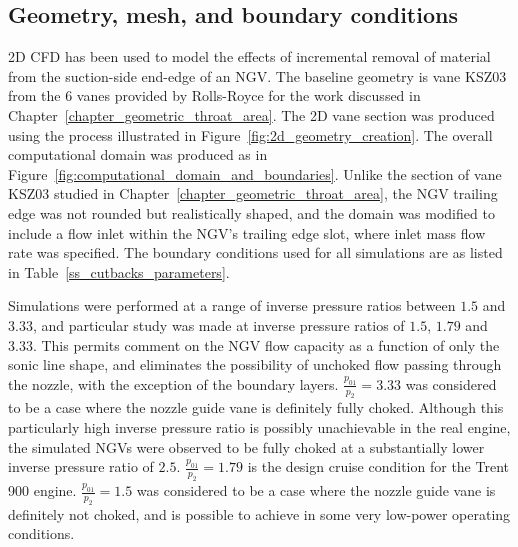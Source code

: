 \documentclass[a4paper, 11pt, oneside]{report}
\begin{document}
\subsection{Geometry, mesh, and boundary conditions}

2D CFD has been used to model the effects of incremental removal of material from the suction-side end-edge of an NGV. The baseline geometry is vane KSZ03 from the 6 vanes provided by Rolls-Royce for the work discussed in Chapter~\ref{chapter_geometric_throat_area}. The 2D vane section was produced using the process illustrated in Figure~\ref{fig:2d_geometry_creation}. The overall computational domain was produced as in Figure~\ref{fig:computational_domain_and_boundaries}. Unlike the section of vane KSZ03 studied in Chapter~\ref{chapter_geometric_throat_area}, the NGV trailing edge was not rounded but realistically shaped, and the domain was modified to include a flow inlet within the NGV's trailing edge slot, where inlet mass flow rate was specified. The boundary conditions used for all simulations are as listed in Table~\ref{ss_cutbacks_parameters}.

Simulations were performed at a range of inverse pressure ratios between $1.5$ and $3.33$, and particular study was made at inverse pressure ratios of $1.5$, $1.79$ and $3.33$. This permits comment on the NGV flow capacity as a function of only the sonic line shape, and eliminates the possibility of unchoked flow passing through the nozzle, with the exception of the boundary layers. $\frac{p_{01}}{p_2}=3.33$ was considered to be a case where the nozzle guide vane is definitely fully choked. Although this particularly high inverse pressure ratio is possibly unachievable in the real engine, the simulated NGVs were observed to be fully choked at a substantially lower inverse pressure ratio of $2.5$. $\frac{p_{01}}{p_2}=1.79$ is the design cruise condition for the Trent 900 engine. $\frac{p_{01}}{p_2}=1.5$ was considered to be a case where the nozzle guide vane is definitely not choked, and is possible to achieve in some very low-power operating conditions. 
\end{document}

